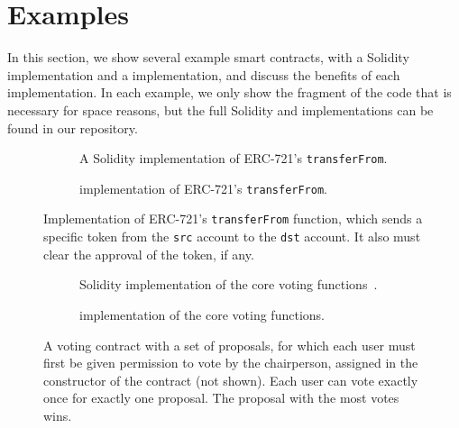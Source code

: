 \documentclass[dvipsnames, usenames, sigconf]{acmart}
\begin{document}
\section{Examples}
In this section, we show several example smart contracts, with a Solidity implementation and a \langName implementation, and discuss the benefits of each implementation.
In each example, we only show the fragment of the code that is necessary for space reasons, but the full Solidity and \langName implementations can be found in our repository.
\begin{figure*}
    \centering
    \begin{subfigure}[t]{0.49\textwidth}
        \centering
        
        \caption{A Solidity implementation of ERC-721's \lstinline{transferFrom}.}
        \label{fig:erc721-impl-sol}
    \end{subfigure}%
    \hfill
    \begin{subfigure}[t]{0.49\textwidth}
        \centering
        
        \caption{\langName implementation of ERC-721's \lstinline{transferFrom}.}
        \label{fig:erc721-impl-flow}
    \end{subfigure}
    \caption{Implementation of ERC-721's \lstinline{transferFrom} function, which sends a specific token from the \lstinline{src} account to the \lstinline{dst} account.
        It also must clear the approval of the token, if any.}
    \label{fig:erc721-impl}
\end{figure*}
\begin{figure*}[ht]
    \centering
    \begin{subfigure}[t]{0.49\textwidth}
        \centering
        
        \caption{Solidity implementation of the core voting functions~\cite{solidityByExample}.}
        \label{fig:voting-impl-sol}
    \end{subfigure}%
    \hfill
    \begin{subfigure}[t]{0.49\textwidth}
        \centering
        
        \caption{\langName implementation of the core voting functions.}
        \label{fig:voting-impl-flow}
    \end{subfigure}
    \caption{A voting contract with a set of proposals, for which each user must first be given permission to vote by the chairperson, assigned in the constructor of the contract (not shown).
    Each user can vote exactly once for exactly one proposal.
    The proposal with the most votes wins.}
    \label{fig:voting-impl}
\end{figure*}
\end{document}
